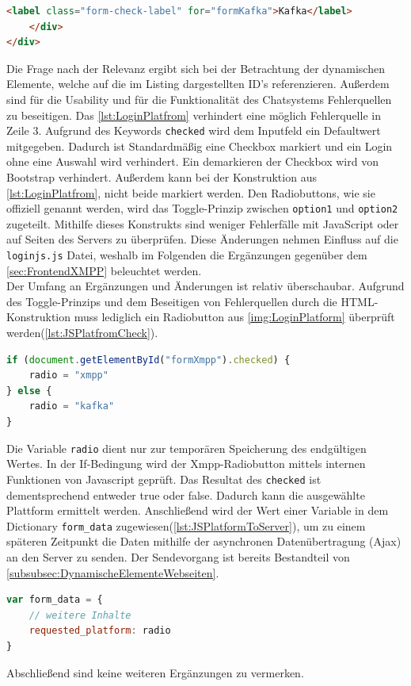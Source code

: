 \documentclass[a4paper,titlepage,halfparskip,12pt]{scrreprt}
\begin{document}
\begin{onehalfspacing}
\begin{lstlisting}[language=HTML,caption=Implementierung der Checkbox für die Plattform ,label={lst:LoginPlatfrom}]
		<label class="form-check-label" for="formKafka">Kafka</label>
	</div>
</div>
\end{lstlisting}
Die Frage nach der Relevanz ergibt sich bei der Betrachtung der dynamischen Elemente, welche auf die im Listing dargestellten ID's referenzieren. Außerdem sind für die Usability und für die Funktionalität des Chatsystems Fehlerquellen zu beseitigen. Das \autoref{lst:LoginPlatfrom} verhindert eine möglich Fehlerquelle in Zeile 3. Aufgrund des Keywords \texttt{checked} wird dem Inputfeld ein Defaultwert mitgegeben. Dadurch ist Standardmäßig eine Checkbox markiert und ein Login ohne eine Auswahl wird verhindert. Ein demarkieren der Checkbox wird von Bootstrap verhindert. Außerdem kann bei der Konstruktion aus \autoref{lst:LoginPlatfrom}, nicht beide markiert werden. Den Radiobuttons, wie sie offiziell genannt werden, wird das Toggle-Prinzip zwischen \texttt{option1} und \texttt{option2} zugeteilt. Mithilfe dieses Konstrukts sind weniger Fehlerfälle mit JavaScript oder auf Seiten des Servers zu überprüfen. Diese Änderungen nehmen Einfluss auf die \texttt{loginjs.js} Datei, weshalb im Folgenden die Ergänzungen gegenüber dem \autoref{sec:FrontendXMPP} beleuchtet werden.\\
Der Umfang an Ergänzungen und Änderungen ist relativ überschaubar. Aufgrund des Toggle-Prinzips und dem Beseitigen von Fehlerquellen durch die HTML-Konstruktion
muss lediglich ein Radiobutton aus \autoref{img:LoginPlatform} überprüft werden(\autoref{lst:JSPlatfromCheck}).
\begin{lstlisting}[language=Javascript,caption= Überprüfung der Plattform mittels JavaScript ,label={lst:JSPlatfromCheck}]
if (document.getElementById("formXmpp").checked) {
	radio = "xmpp"
} else {
	radio = "kafka"
}
\end{lstlisting}
Die Variable \texttt{radio} dient nur zur temporären Speicherung des endgültigen Wertes. In der If-Bedingung wird der \glqq Xmpp\grqq-Radiobutton mittels internen Funktionen von Javascript geprüft. Das Resultat des \texttt{checked} ist dementsprechend entweder true oder false. Dadurch kann die ausgewählte Plattform ermittelt werden. Anschließend wird der Wert einer Variable in dem Dictionary \texttt{form\_data} zugewiesen(\autoref{lst:JSPlatformToServer}), um zu einem späteren Zeitpunkt die Daten mithilfe der asynchronen Datenübertragung (Ajax) an den Server zu senden. Der Sendevorgang ist bereits Bestandteil von \autoref{subsubsec:DynamischeElementeWebseiten}.
\begin{lstlisting}[language=Javascript,caption=Ergänzung der Dateninhalte um die ausgewählte Plattform ,label={lst:JSPlatformToServer}]
var form_data = {
	// weitere Inhalte
	requested_platform: radio
}
\end{lstlisting}
Abschließend sind keine weiteren Ergänzungen zu vermerken.


\end{onehalfspacing}
\end{document}
